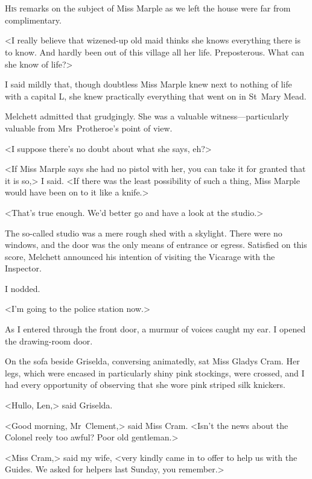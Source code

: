 \chapter[Chapter  \thechapter]{}


\lettrine{H}{is} remarks on the subject of Miss Marple as we left the house were far from complimentary.

\zz
<I really believe that wizened-up old maid thinks she knows everything there is to know. And hardly been out of this village all her life. Preposterous. What can she know of life?>

I said mildly that, though doubtless Miss Marple knew next to nothing of life with a capital L, she knew practically everything that went on in St~Mary Mead.

Melchett admitted that grudgingly. She was a valuable witness—particularly valuable from Mrs~Protheroe's point of view.

<I suppose there's no doubt about what she says, eh?>

<If Miss Marple says she had no pistol with her, you can take it for granted that it is so,> I said. <If there was the least possibility of such a thing, Miss Marple would have been on to it like a knife.>

<That's true enough. We'd better go and have a look at the studio.>

The so-called studio was a mere rough shed with a skylight. There were no windows, and the door was the only means of entrance or egress. Satisfied on this score, Melchett announced his intention of visiting the Vicarage with the Inspector.

I nodded.

<I'm going to the police station now.>

As I entered through the front door, a murmur of voices caught my ear. I opened the drawing-room door.

On the sofa beside Griselda, conversing animatedly, sat Miss Gladys Cram. Her legs, which were encased in particularly shiny pink stockings, were crossed, and I had every opportunity of observing that she wore pink striped silk knickers.

<Hullo, Len,> said Griselda.

<Good morning, Mr~Clement,> said Miss Cram. <Isn't the news about the Colonel reely too awful? Poor old gentleman.>

<Miss Cram,> said my wife, <very kindly came in to offer to help us with the Guides. We asked for helpers last Sunday, you remember.>


